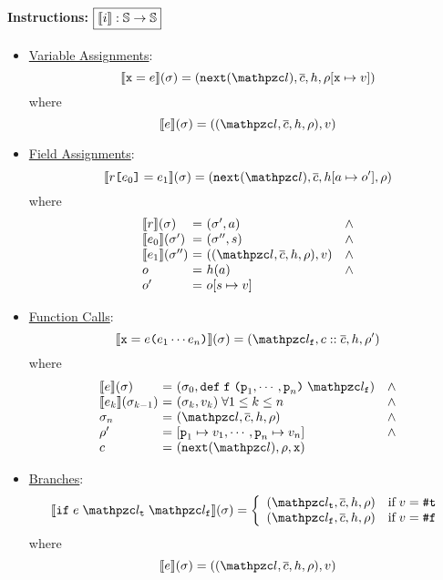 \paragraph{Instructions: $\framebox{$\sem{\inst}: \stset \rightarrow \stset$}$}
\begin{itemize}
  \item \underline{Variable Assignments}:
    \[
      \sem{\varx = \expr}(\st) =
      (\getnext(\lab), \ctxts, \heap, \env[\varx \mapsto \val])
    \]
    where
    \[
      \sem{\expr}(\st) = ((\lab, \ctxts, \heap, \env), \val)
    \]

  \item \underline{Field Assignments}:
    \[
      \sem{\refer \kwsl \expr_0 \kwsr = \expr_1}(\st) =
      (\getnext(\lab), \ctxts, \heap[\addr \mapsto \obj'], \env)
    \]
    where
    \[
      \begin{array}{l@{~}c@{~}ll}
        \sem{\refer}(\st) &=& (\st', \addr) &\wedge\\
        \sem{\expr_0}(\st') &=& (\st'', \str) &\wedge\\
        \sem{\expr_1}(\st'') &=& ((\lab, \ctxts, \heap, \env), \val) &\wedge\\
        \obj &=& \heap(\addr) &\wedge\\
        \obj' &=& \obj[\str \mapsto \val]\\
      \end{array}
    \]

  \item \underline{Function Calls}:
    \[
      \sem{\varx = \expr \kwrl \expr_1 \cdots \expr_n \kwrr}(\st) =
      (\lab_\varf, \ctxt :: \ctxts, \heap, \env')
    \]
    where
    \[
      \begin{array}{l@{~}c@{~}ll}
        \sem{\expr}(\st) &=& (\st_0, \kwdef \; \varf \; \kwrl \varp_1, \cdots,
        \varp_n \kwrr \; \lab_\varf) &\wedge\\
        \sem{\expr_k}(\st_{k-1}) &=& (\st_k, \val_k) \; \forall 1 \leq k \leq n
        &\wedge\\
        \st_n &=& (\lab, \ctxts, \heap, \env) &\wedge\\
        \env' &=& [\varp_1 \mapsto \val_1, \cdots, \varp_n \mapsto \val_n]
        &\wedge\\
        \ctxt &=& (\getnext(\lab), \env, \varx)\\
      \end{array}
    \]

  \item \underline{Branches}:
    \[
      \sem{\kwif \; \expr \; \lab_\vart \; \lab_\varf}(\st) =
      \left\{
        \begin{array}{ll}
          (\lab_\vart, \ctxts, \heap, \env) & \text{if} \; \val = \true\\
          (\lab_\varf, \ctxts, \heap, \env) & \text{if} \; \val = \false\\
        \end{array}
      \right.
    \]
    where
    \[
      \sem{\expr}(\st) = ((\lab, \ctxts, \heap, \env), \val)
    \]


\end{itemize}
